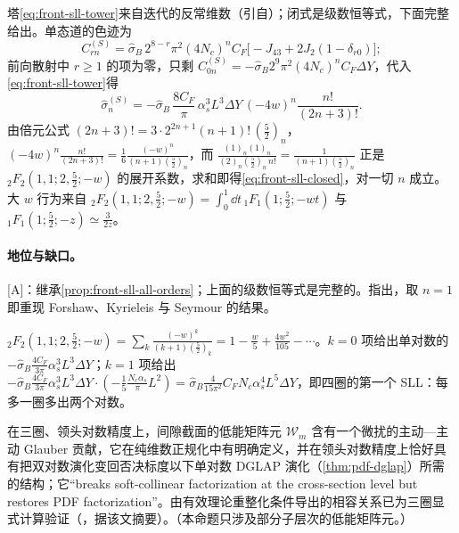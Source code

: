 \begin{proofsketch}
塔\cref{eq:front-sll-tower}来自迭代的反常维数（引自\cite{Becher:2021zkk}）；闭式是级数恒等式，下面完整给出。单态道的色迹为\cite[式~(19)]{Becher:2021zkk}
\begin{equation*}
C^{(S)}_{rn}=\hat\sigma_B\,2^{8-r}\pi^2(4N_c)^nC_F\bigl[-J_{43}+2J_2(1-\delta_{r0})\bigr];
\end{equation*}
前向散射中 $r\ge1$ 的项为零，只剩 $C^{(S)}_{0n}=-\hat\sigma_B2^9\pi^2(4N_c)^nC_F\Delta Y$，代入\cref{eq:front-sll-tower}得
\begin{equation*}
\hat\sigma^{(S)}_n=-\hat\sigma_B\,\frac{8C_F}{\pi}\,\alpha_s^3L^3\Delta Y\,(-4w)^n\frac{n!}{(2n+3)!}.
\end{equation*}由倍元公式 $(2n+3)!=3\cdot2^{2n+1}(n+1)!\,(\frac52)_n$，$(-4w)^n\frac{n!}{(2n+3)!}=\frac16\frac{(-w)^n}{(n+1)(\frac52)_n}$，而 $\frac{(1)_n(1)_n}{(2)_n(\frac52)_n\,n!}=\frac{1}{(n+1)(\frac52)_n}$ 正是 ${}_2F_2(1,1;2,\frac52;-w)$ 的展开系数，求和即得\cref{eq:front-sll-closed}，对一切 $n$ 成立。大 $w$ 行为来自 ${}_2F_2(1,1;2,\frac52;-w)=\int_0^1\dd t\,{}_1F_1(1;\frac52;-wt)$ 与 ${}_1F_1(1;\frac52;-z)\simeq\frac{3}{2z}$。
\end{proofsketch}

\paragraph{地位与缺口。}[A]：继承\cref{prop:front-sll-all-orders}；上面的级数恒等式是完整的。\cite{Becher:2021zkk}指出，取 $n=1$ 即重现 Forshaw、Kyrieleis 与 Seymour 的结果\cite{ForshawKyrieleisSeymour2006}。

\begin{example}[由闭式读出第一个超领头对数]\label{ex:front-sll-first}
${}_2F_2(1,1;2,\frac52;-w)=\sum_k\frac{(-w)^k}{(k+1)(\frac52)_k}=1-\frac w5+\frac{4w^2}{105}-\cdots$。$k=0$ 项给出单对数的 $-\hat\sigma_B\frac{4C_F}{3\pi}\alpha_s^3L^3\Delta Y$；$k=1$ 项给出 $-\hat\sigma_B\frac{4C_F}{3\pi}\alpha_s^3L^3\Delta Y\cdot(-\frac15\frac{N_c\alpha_s}{\pi}L^2)=\hat\sigma_B\frac{4}{15\pi^2}C_FN_c\alpha_s^4L^5\Delta Y$，即四圈的第一个 SLL：每多一圈多出两个对数。
\end{example}

\begin{proposition}\label{prop:front-restoration}
在三圈、领头对数精度上，间隙截面的低能矩阵元 $\mathcal W_m$ 含有一个微扰的主动—主动 Glauber 贡献，它在纯维数正规化中有明确定义，并在领头对数精度上恰好具有把双对数演化变回否决标度以下单对数 DGLAP 演化（\cref{thm:pdf-dglap}）所需的结构；它“breaks soft-collinear factorization at the cross-section level but restores PDF factorization”\cite{Becher:2024kmk}。由有效理论重整化条件导出的相容关系已为三圈显式计算验证（\cite{Becher:2025igg}，据该文摘要）。（本命题只涉及部分子层次的低能矩阵元。）
\end{proposition}


